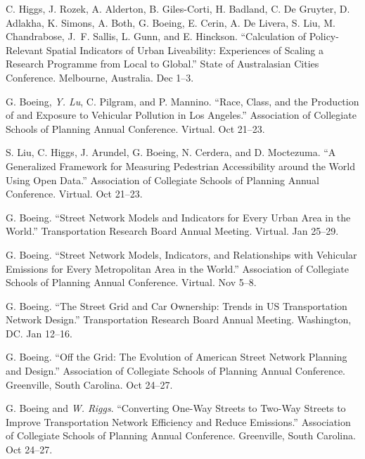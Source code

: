 \documentclass[11pt,letterpaper]{report} %
\begin{document}
\begin{tablist}
\item[2021] \tab{}C. Higgs, J. Rozek, A. Alderton, B. Giles-Corti, H. Badland, C. De Gruyter, D. Adlakha, K. Simons, A. Both, G. Boeing, E. Cerin, A. De Livera, S. Liu, M. Chandrabose, J.~F. Sallis, L. Gunn, and E. Hinckson. \enquote{Calculation of Policy-Relevant Spatial Indicators of Urban Liveability: Experiences of Scaling a Research Programme from Local to Global.} State of Australasian Cities Conference. Melbourne, Australia. Dec 1--3.

\item[2021] \tab{}G. Boeing, \textit{Y. Lu}, C. Pilgram, and P. Mannino. \enquote{Race, Class, and the Production of and Exposure to Vehicular Pollution in Los Angeles.} Association of Collegiate Schools of Planning Annual Conference. Virtual. Oct 21--23.

\item[2021] \tab{}S. Liu, C. Higgs, J. Arundel, G. Boeing, N. Cerdera, and D. Moctezuma. \enquote{A Generalized Framework for Measuring Pedestrian Accessibility around the World Using Open Data.} Association of Collegiate Schools of Planning Annual Conference. Virtual. Oct 21--23.

\item[2021] \tab{}G. Boeing. \enquote{Street Network Models and Indicators for Every Urban Area in the World.} Transportation Research Board Annual Meeting. Virtual. Jan 25--29.

\item[2020] \tab{}G. Boeing. \enquote{Street Network Models, Indicators, and Relationships with Vehicular Emissions for Every Metropolitan Area in the World.} Association of Collegiate Schools of Planning Annual Conference. Virtual. Nov 5--8.

\item[2020] \tab{}G. Boeing. \enquote{The Street Grid and Car Ownership: Trends in US Transportation Network Design.} Transportation Research Board Annual Meeting. Washington, DC\@. Jan 12--16.

\item[2019] \tab{}G. Boeing. \enquote{Off the Grid: The Evolution of American Street Network Planning and Design.} Association of Collegiate Schools of Planning Annual Conference. Greenville, South Carolina. Oct 24--27.

\item[2019] \tab{}G. Boeing and \textit{W. Riggs}. \enquote{Converting One-Way Streets to Two-Way Streets to Improve Transportation Network Efficiency and Reduce Emissions.} Association of Collegiate Schools of Planning Annual Conference. Greenville, South Carolina. Oct 24--27.


\end{tablist}
\end{document}
